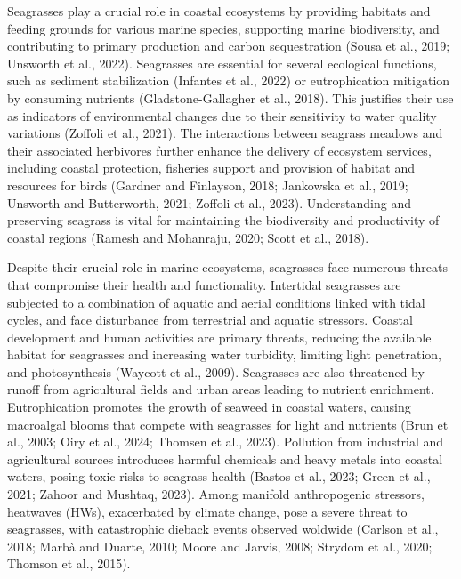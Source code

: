 \documentclass[
  letterpaper,
  DIV=11,
  numbers=noendperiod]{scrartcl}
\begin{document}
Seagrasses play a crucial role in coastal ecosystems by providing
habitats and feeding grounds for various marine species, supporting
marine biodiversity, and contributing to primary production and carbon
sequestration (Sousa et al., 2019; Unsworth et al., 2022). Seagrasses
are essential for several ecological functions, such as sediment
stabilization (Infantes et al., 2022) or eutrophication mitigation by
consuming nutrients (Gladstone-Gallagher et al., 2018). This justifies
their use as indicators of environmental changes due to their
sensitivity to water quality variations (Zoffoli et al., 2021). The
interactions between seagrass meadows and their associated herbivores
further enhance the delivery of ecosystem services, including coastal
protection, fisheries support and provision of habitat and resources for
birds (Gardner and Finlayson, 2018; Jankowska et al., 2019; Unsworth and
Butterworth, 2021; Zoffoli et al., 2023). Understanding and preserving
seagrass is vital for maintaining the biodiversity and productivity of
coastal regions (Ramesh and Mohanraju, 2020; Scott et al., 2018).

Despite their crucial role in marine ecosystems, seagrasses face
numerous threats that compromise their health and functionality.
Intertidal seagrasses are subjected to a combination of aquatic and
aerial conditions linked with tidal cycles, and face disturbance from
terrestrial and aquatic stressors. Coastal development and human
activities are primary threats, reducing the available habitat for
seagrasses and increasing water turbidity, limiting light penetration,
and photosynthesis (Waycott et al., 2009). Seagrasses are also
threatened by runoff from agricultural fields and urban areas leading to
nutrient enrichment. Eutrophication promotes the growth of seaweed in
coastal waters, causing macroalgal blooms that compete with seagrasses
for light and nutrients (Brun et al., 2003; Oiry et al., 2024; Thomsen
et al., 2023). Pollution from industrial and agricultural sources
introduces harmful chemicals and heavy metals into coastal waters,
posing toxic risks to seagrass health (Bastos et al., 2023; Green et
al., 2021; Zahoor and Mushtaq, 2023). Among manifold anthropogenic
stressors, heatwaves (HWs), exacerbated by climate change, pose a severe
threat to seagrasses, with catastrophic dieback events observed woldwide
(Carlson et al., 2018; Marbà and Duarte, 2010; Moore and Jarvis, 2008;
Strydom et al., 2020; Thomson et al., 2015).
\end{document}
